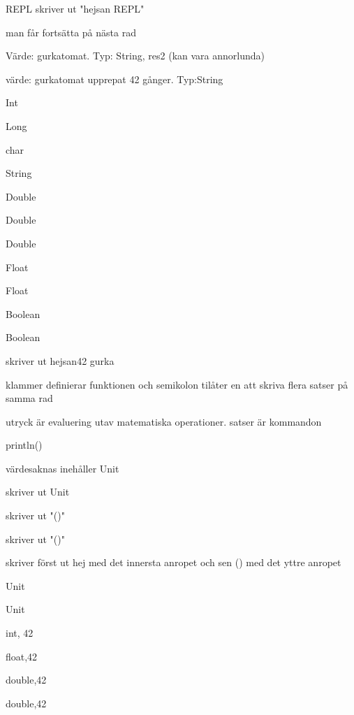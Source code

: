 
\ExerciseSolution{\ExeWeekONE}

\BasicTasks %

\Task %

\Subtask REPL skriver ut "hejsan REPL"

\Subtask man får fortsätta på nästa rad

\Subtask Värde: gurkatomat. Typ: String, res2 (kan vara annorlunda)

\Subtask värde: gurkatomat upprepat 42 gånger. Typ:String

\Task %
 
\Task %

\Subtask Int

\Subtask Long

\Subtask char

\Subtask String

\Subtask Double

\Subtask Double

\Subtask Double

\Subtask Float

\Subtask Float

\Subtask Boolean

\Subtask Boolean


\Task %
 skriver ut hejsan42
gurka

 klammer definierar funktionen och semikolon tilåter en att skriva flera satser på samma rad

\Task %
\Subtask  utryck är evaluering utav matematiska operationer. satser är kommandon

\Subtask println()

\Subtask 

 värdesaknas inehåller Unit

 skriver ut Unit

 skriver ut "()"

 skriver ut "()"

 skriver först ut hej med det innersta anropet och sen () med det yttre anropet

\Subtask  Unit

\Subtask  Unit

\Task %

\Subtask  int, 42

\Subtask float,42

\Subtask double,42

\Subtask double,42

